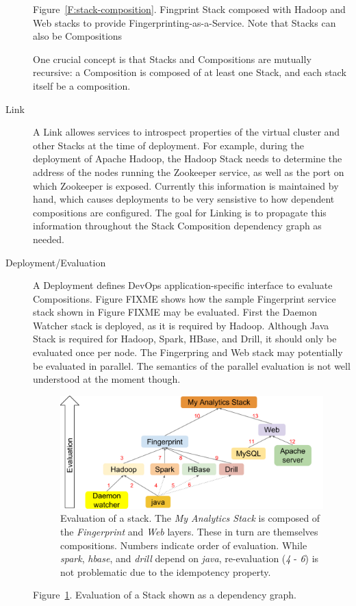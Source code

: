 \documentclass[9pt,twocolumn,twoside]{styles/osajnl}
\begin{document}
\begin{description}
  Figure~\ref{F:stack-composition}. Fingprint Stack composed with Hadoop and Web stacks to
  provide Fingerprinting-as-a-Service. Note that Stacks can also be
  Compositions


  One crucial concept is that Stacks and Compositions are mutually
  recursive: a Composition is composed of at least one Stack, and each
  stack itself be a composition.


\item[Link] A Link allowes services to introspect properties of the
  virtual cluster and other Stacks at the time of deployment. For
  example, during the deployment of Apache Hadoop, the Hadoop Stack
  needs to determine the address of the nodes running the Zookeeper
  service, as well as the port on which Zookeeper is
  exposed. Currently this information is maintained by hand, which
  causes deployments to be very sensistive to how dependent
  compositions are configured. The goal for Linking is to propagate
  this information throughout the Stack Composition dependency graph
  as needed.


\item[Deployment/Evaluation] A Deployment defines DevOps
  application-specific interface to evaluate Compositions.  Figure
  FIXME shows how the sample Fingerprint service stack shown in Figure
  FIXME may be evaluated. First the Daemon Watcher stack is deployed,
  as it is required by Hadoop. Although Java Stack is required for
  Hadoop, Spark, HBase, and Drill, it should only be evaluated once
  per node. The Fingerpring and Web stack may potentially be evaluated
  in parallel. The semantics of the parallel evaluation is not well
  understood at the moment though.


  
  \begin{figure}
    \centering
    \includegraphics[width=1\columnwidth]{images/cloudmesh-stack-graph.pdf}
    \caption{Evaluation of a stack.
      The {\it My Analytics Stack} is composed of the {\it Fingerprint} and {\it Web} layers.
      These in turn are themselves compositions.
      Numbers indicate order of evaluation.
      While {\it spark}, {\it hbase}, and {\it drill} depend on {\it java}, 
      re-evaluation (\textit{4} - \textit{6}) is not problematic due to the idempotency property.
      \label{F:stack-graph}}
  \end{figure}


  Figure~\ref{F:stack-graph}. Evaluation of a Stack shown as a dependency graph.


\end{description}
\end{document}
